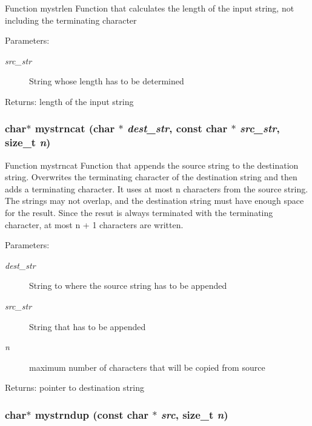 Function mystrlen Function that calculates the length of the input string, not including the terminating character \begin{Desc}
\item[Parameters:]
\begin{description}
\item[{\em src\_\-str}]String whose length has to be determined \end{description}
\end{Desc}
\begin{Desc}
\item[Returns:]length of the input string \end{Desc}
\subsubsection{\setlength{\rightskip}{0pt plus 5cm}char$\ast$ mystrncat (char $\ast$ {\em dest\_\-str}, const char $\ast$ {\em src\_\-str}, size\_\-t {\em n})}\label{mystring_8h_64269d8e515794bc11b3477159a7812d}


Function mystrncat Function that appends the source string to the destination string. Overwrites the terminating character of the destination string and then adds a terminating character. It uses at most n characters from the source string. The strings may not overlap, and the destination string must have enough space for the result. Since the resut is always terminated with the terminating character, at most n + 1 characters are written. \begin{Desc}
\item[Parameters:]
\begin{description}
\item[{\em dest\_\-str}]String to where the source string has to be appended \item[{\em src\_\-str}]String that has to be appended \item[{\em n}]maximum number of characters that will be copied from source \end{description}
\end{Desc}
\begin{Desc}
\item[Returns:]pointer to destination string \end{Desc}
\subsubsection{\setlength{\rightskip}{0pt plus 5cm}char$\ast$ mystrndup (const char $\ast$ {\em src}, size\_\-t {\em n})}\label{mystring_8h_384fa34f59b9f08fcc03ec781ffa83b0}


